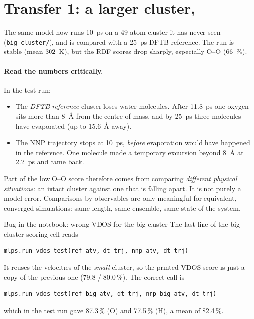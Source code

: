 \documentclass[11pt,a4paper]{article}
\begin{document}
\section{Transfer 1: a larger cluster, }
\label{sec:big}

The same model now runs \SI{10}{ps} on a 49-atom cluster it has never seen
(\texttt{big\_cluster/}), and is compared with a \SI{25}{ps} DFTB reference.
The run is stable (mean \SI{302}{K}), but the RDF scores drop sharply,
especially O--O (\SI{66}{\%}).

\paragraph{Read the numbers critically.} In the test run:
\begin{itemize}[nosep]
  \item The \emph{DFTB reference} cluster loses water molecules. After
        \SI{11.8}{ps} one oxygen sits more than \SI{8}{\angstrom} from the
        centre of mass, and by \SI{25}{ps} three molecules have evaporated
        (up to \SI{15.6}{\angstrom} away).
  \item The NNP trajectory stops at \SI{10}{ps}, \emph{before} evaporation
        would have happened in the reference. One molecule made a temporary
        excursion beyond \SI{8}{\angstrom} at \SI{2.2}{ps} and came back.
\end{itemize}
Part of the low O--O score therefore comes from comparing \emph{different
physical situations}: an intact cluster against one that is falling
apart. It is not purely a model error. Comparisons by observables are only
meaningful for equivalent, converged simulations: same length, same
ensemble, same state of the system.

\begin{warnbox}{Bug in the notebook: wrong VDOS for the big cluster}
The last line of the big-cluster scoring cell reads
\begin{lstlisting}
mlps.run_vdos_test(ref_atv, dt_trj, nnp_atv, dt_trj)
\end{lstlisting}
It reuses the velocities of the \emph{small} cluster, so the printed VDOS
score is just a copy of the previous one (79.8 / 80.0\,\%). The correct call is
\begin{lstlisting}
mlps.run_vdos_test(ref_big_atv, dt_trj, nnp_big_atv, dt_trj)
\end{lstlisting}
which in the test run gave 87.3\,\% (O) and 77.5\,\% (H), a mean of 82.4\,\%.
\end{warnbox}
\end{document}
